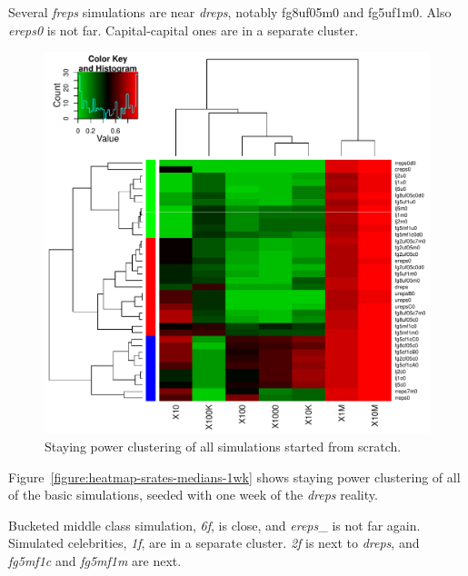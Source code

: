 \documentclass[10pt,oneside]{memoir}
\begin{document}
\begin{Spacing}{2}
Several {\itshape freps} simulations are near {\itshape dreps}, notably fg8uf05m0 and fg5uf1m0.  Also {\itshape ereps0} is not far.  Capital-capital ones are in a separate cluster.



\begin{figure}
\begin{center}
    \includegraphics{figures/crop/heatmap-srates-medians-0wk}
    \caption{Staying power clustering of all simulations started from scratch.}
    \label{figure:heatmap-srates-medians-0wk}
\end{center}
\end{figure}
Figure~\ref{figure:heatmap-srates-medians-1wk} shows staying power clustering of all of the basic simulations, seeded with one week of the {\itshape dreps} reality.


Bucketed middle class simulation, {\itshape 6f}, is close, and {\itshape ereps}\_ is not far again.  Simulated celebrities, {\itshape 1f}, are in a separate cluster.  {\itshape 2f} is next to {\itshape dreps}, and {\itshape fg5mf1c} and {\itshape fg5mf1m} are next.




\end{Spacing}
\end{document}
